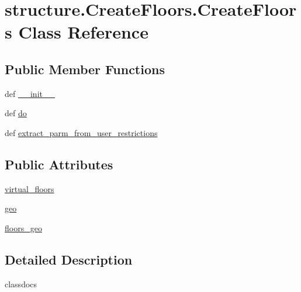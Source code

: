 \hypertarget{classstructure_1_1_create_floors_1_1_create_floors}{\section{structure.\-Create\-Floors.\-Create\-Floors Class Reference}
\label{classstructure_1_1_create_floors_1_1_create_floors}
}
\subsection*{Public Member Functions}
\begin{DoxyCompactItemize}
\item 
def \hyperlink{classstructure_1_1_create_floors_1_1_create_floors_ad8372cb8b9900463f3484e34f5e8e5ea}{\-\_\-\-\_\-init\-\_\-\-\_\-}
\item 
def \hyperlink{classstructure_1_1_create_floors_1_1_create_floors_a482813e42b546e7aa320e6eeb0d4f6ef}{do}
\item 
def \hyperlink{classstructure_1_1_create_floors_1_1_create_floors_ab0ff6e4d885118987b0ee6d49b1663d1}{extract\-\_\-parm\-\_\-from\-\_\-user\-\_\-restrictions}
\end{DoxyCompactItemize}
\subsection*{Public Attributes}
\begin{DoxyCompactItemize}
\item 
\hyperlink{classstructure_1_1_create_floors_1_1_create_floors_a06a8ed4378e0be621469a68a82d0db15}{virtual\-\_\-floors}
\item 
\hyperlink{classstructure_1_1_create_floors_1_1_create_floors_a4b6974fee8c79a06af299202a961b835}{geo}
\item 
\hyperlink{classstructure_1_1_create_floors_1_1_create_floors_a1bb632bb44d72df5ad57e25a4da44585}{floors\-\_\-geo}
\end{DoxyCompactItemize}


\subsection{Detailed Description}
\begin{DoxyVerb}classdocs
\end{DoxyVerb}
 

